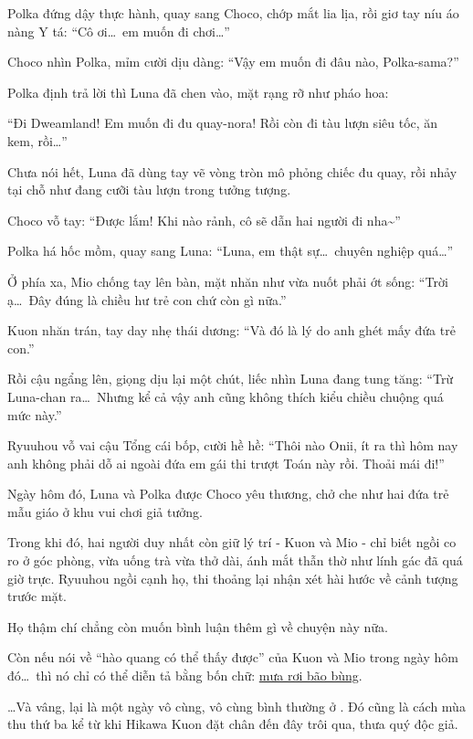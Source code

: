 \documentclass[../main.tex]{subfiles}
\begin{document}
Polka đứng dậy thực hành, quay sang Choco, chớp mắt lia lịa, rồi giơ tay níu áo nàng Y tá: ``Cô ơi\dots\ em muốn đi chơi\dots''

Choco nhìn Polka, mỉm cười dịu dàng: ``Vậy em muốn đi đâu nào, Polka-sama?''

Polka định trả lời thì Luna đã chen vào, mặt rạng rỡ như pháo hoa:

``Đi Dweamland! Em muốn đi đu quay-nora! Rồi còn đi tàu lượn siêu tốc, ăn kem, rồi\dots''

Chưa nói hết, Luna đã dùng tay vẽ vòng tròn mô phỏng chiếc đu quay, rồi nhảy tại chỗ như đang cưỡi tàu lượn trong tưởng tượng.

Choco vỗ tay: ``Được lắm! Khi nào rảnh, cô sẽ dẫn hai người đi nha\~{}''

Polka há hốc mồm, quay sang Luna: ``Luna, em thật sự\dots\ chuyên nghiệp quá\dots''

Ở phía xa, Mio chống tay lên bàn, mặt nhăn như vừa nuốt phải ớt sống: ``Trời ạ\dots\ Đây đúng là chiều hư trẻ con chứ còn gì nữa.''

Kuon nhăn trán, tay day nhẹ thái dương: ``Và đó là lý do anh ghét mấy đứa trẻ con.''

Rồi cậu ngẩng lên, giọng dịu lại một chút, liếc nhìn Luna đang tung tăng: ``Trừ Luna-chan ra\dots\ Nhưng kể cả vậy anh cũng không thích kiểu chiều chuộng quá mức này.''

Ryuuhou vỗ vai cậu Tổng cái bốp, cười hề hề: ``Thôi nào Onii, ít ra thì hôm nay anh không phải dỗ ai ngoài đứa em gái thi trượt Toán này rồi. Thoải mái đi!''

Ngày hôm đó, Luna và Polka được Choco yêu thương, chở che như hai đứa trẻ mẫu giáo ở khu vui chơi giả tưởng.

Trong khi đó, hai người duy nhất còn giữ lý trí - Kuon và Mio - chỉ biết ngồi co ro ở góc phòng, vừa uống trà vừa thở dài, ánh mắt thẫn thờ như lính gác đã quá giờ trực. Ryuuhou ngồi cạnh họ, thi thoảng lại nhận xét hài hước về cảnh tượng trước mặt.

Họ thậm chí chẳng còn muốn bình luận thêm gì về chuyện này nữa.

Còn nếu nói về ``hào quang có thể thấy được'' của Kuon và Mio trong ngày hôm đó\dots\ thì nó chỉ có thể diễn tả bằng bốn chữ: \underline{mưa rơi bão bùng}.

\dots Và vâng, lại là một ngày vô cùng, vô cùng bình thường ở \hll. Đó cũng là cách mùa thu thứ ba kể từ khi Hikawa Kuon đặt chân đến đây trôi qua, thưa quý độc giả.
\end{document}
